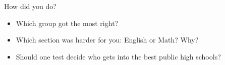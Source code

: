 \documentclass[aspectratio=169,11pt]{beamer}
\begin{document}
\begin{frame}{How did you do?}
  \begin{itemize}\setlength{\itemsep}{1em}
    \item Which group got the most right?
    \item Which section was harder for you: \alert{English} or \alert{Math}? Why?
    \item Should one test decide who gets into the best public high schools?
  \end{itemize}
\end{frame}
\end{document}
